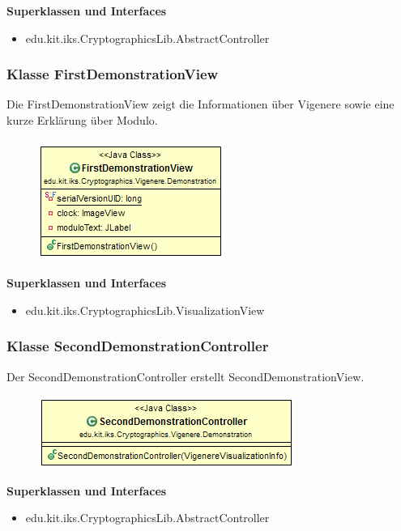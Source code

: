 \documentclass{article}
\begin{document}
      \textbf{Superklassen und Interfaces}
      \begin{itemize}
        \item edu.kit.iks.CryptographicsLib.AbstractController
      \end{itemize}

    \subsubsection{Klasse FirstDemonstrationView}
      Die FirstDemonstrationView zeigt die Informationen über Vigenere sowie eine kurze Erklärung über Modulo.
      \begin{figure}[H]
        \centering
        \includegraphics{resources/edu-kit-iks-Cryptographics-Vigenere-FirstDemonstrationView}
      \end{figure}

      \textbf{Superklassen und Interfaces}
      \begin{itemize}
        \item edu.kit.iks.CryptographicsLib.VisualizationView
      \end{itemize}

    \subsubsection{Klasse SecondDemonstrationController}
      Der SecondDemonstrationController erstellt SecondDemonstrationView.
      \begin{figure}[H]
        \centering
        \includegraphics{resources/edu-kit-iks-Cryptographics-Vigenere-SecondDemonstrationController}
      \end{figure}

      \textbf{Superklassen und Interfaces}
      \begin{itemize}
        \item edu.kit.iks.CryptographicsLib.AbstractController
      \end{itemize}
\end{document}
